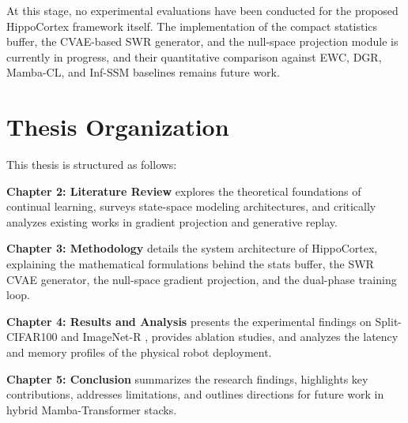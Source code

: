 At this stage, no experimental evaluations have been conducted for the proposed HippoCortex framework itself. The implementation of the compact statistics buffer, the CVAE-based SWR generator, and the null-space projection module is currently in progress, and their quantitative comparison against EWC, DGR, Mamba-CL, and Inf-SSM baselines remains future work.

\section{Thesis Organization}
\label{sec:organization}

This thesis is structured as follows:

\textbf{Chapter 2: Literature Review} explores the theoretical foundations of continual learning, surveys state-space modeling architectures, and critically analyzes existing works in gradient projection and generative replay.

\textbf{Chapter 3: Methodology} details the system architecture of HippoCortex, explaining the mathematical formulations behind the stats buffer, the SWR CVAE generator, the null-space gradient projection, and the dual-phase training loop.

\textbf{Chapter 4: Results and Analysis} presents the experimental findings on Split-CIFAR100 and ImageNet-R \cite{hendrycksManyFacesRobustness2021}, provides ablation studies, and analyzes the latency and memory profiles of the physical robot deployment.

\textbf{Chapter 5: Conclusion} summarizes the research findings, highlights key contributions, addresses limitations, and outlines directions for future work in hybrid Mamba-Transformer stacks.
